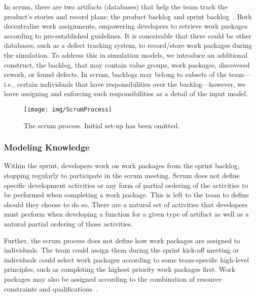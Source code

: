 In scrum, there are two artifacts (databases) that help the team track the
product's stories and record plans: the product backlog and sprint
backlog~\cite{rubin_essential_2012}.  Both decentralize work assignments,
empowering developers to retrieve work packages according to pre-established
guidelines.  It is conceivable that there could be other databases, such as a
defect tracking system, to record/store work packages during the simulation.  To
address this in simulation models, we introduce an additional construct, the
backlog, that may contain value groups, work packages, discovered rework, or
found defects.  In scrum, backlogs may belong to subsets of the team---i.e.,
certain individuals that have responsibilities over the backlog---however, we
leave assigning and enforcing such responsibilities as a detail of the input
model.

\begin{figure}[htb]
    \centering
        \texttt{[image: img/ScrumProcess]}
    \caption{The scrum process.  Initial set-up has been omitted.}
    \label{fig:scrum}
\end{figure}



\subsubsection{Modeling Knowledge}
Within the sprint, developers work on work packages from the sprint backlog,
stopping regularly to participate in the scrum meeting.  Scrum does
not define specific development activities or any form of partial ordering of
the activities to be performed when completing a work package.  This is left to
the team to define should they choose to do so.  There are a natural set of
activities that developers must perform when developing a function for a given
type of artifact as well as a natural partial ordering of those activities.

Further, the scrum process does not define how work packages are assigned to
individuals.  The team could assign them during the sprint kick-off meeting or
individuals could select work packages according to some team-specific
high-level principles, such as completing the highest priority work packages
first.  Work packages may also be assigned according to the combination of
resource constraints and qualifications~\cite[p.352]{rubin_essential_2012}.

